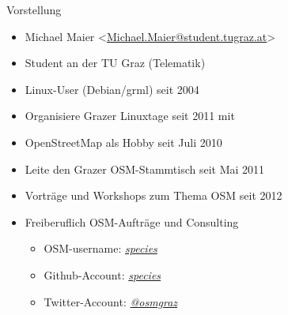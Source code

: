 \documentclass{beamer}
\begin{document}
\begin{frame}{Vorstellung}

  \begin{itemize}
    \item Michael Maier \textless \href{mailto:Michael.Maier@student.tugraz.at}{Michael.Maier@student.tugraz.at}\textgreater
    \item Student an der TU Graz (Telematik)
\vspace{0.3cm}
    \item Linux-User (Debian/grml) seit 2004
    \item Organisiere Grazer Linuxtage seit 2011 mit
    \item OpenStreetMap als Hobby seit Juli 2010
    \item Leite den Grazer OSM-Stammtisch seit Mai 2011
\vspace{0.3cm}
    \item Vorträge und Workshops zum Thema OSM seit 2012
    \item Freiberuflich OSM-Aufträge und Consulting
    \begin{itemize}
      \item OSM-username: \emph{\href{http://www.openstreetmap.org/user/species}{species}}
      \item Github-Account: \emph{\href{https://github.com/species}{species}}
      \item Twitter-Account: \emph{\href{https://twitter.com/osmgraz}{@osmgraz}}
    \end{itemize}
  \end{itemize}
\end{frame}


\end{document}
